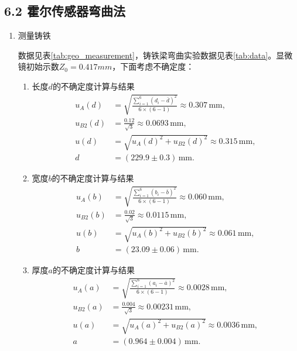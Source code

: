 \documentclass[11pt]{article}
\begin{document}
\subsection*{6.2 霍尔传感器弯曲法}
\begin{enumerate}
    \item 测量铸铁
    
    数据见表\ref{tab:geo_measurement}，铸铁梁弯曲实验数据见表\ref{tab:data}。显微镜初始示数$Z_0 = 0.417mm$，下面考虑不确定度：
\begin{enumerate}
    \item 长度\( d \)的不确定度计算与结果
    \begin{align*}
        u_A(d) &= \sqrt{\frac{\sum_{i=1}^{6}(d_i - \bar{d})^2}{6 \times (6-1)}} \approx 0.307 \, \text{mm}, \\
        u_{B2}(d) &= \frac{0.12}{\sqrt{3}} \approx 0.0693 \, \text{mm}, \\
        u(d) &= \sqrt{u_A(d)^2 + u_{B2}(d)^2} \approx 0.315 \, \text{mm}, \\
        d &= (229.9 \pm 0.3) \, \text{mm}.
    \end{align*}

    \item 宽度\( b \)的不确定度计算与结果
    \begin{align*}
        u_A(b) &= \sqrt{\frac{\sum_{i=1}^{6}(b_i - \bar{b})^2}{6 \times (6-1)}} \approx 0.060 \, \text{mm}, \\
        u_{B2}(b) &= \frac{0.02}{\sqrt{3}} \approx 0.0115 \, \text{mm}, \\
        u(b) &= \sqrt{u_A(b)^2 + u_{B2}(b)^2} \approx 0.061 \, \text{mm}, \\
        b &= (23.09 \pm 0.06) \, \text{mm}.
    \end{align*}

    \item 厚度\( a \)的不确定度计算与结果
    \begin{align*}
        u_A(a) &= \sqrt{\frac{\sum_{i=1}^{6}(a_i - \bar{a})^2}{6 \times (6-1)}} \approx 0.0028 \, \text{mm}, \\
        u_{B2}(a) &= \frac{0.004}{\sqrt{3}} \approx 0.00231 \, \text{mm}, \\
        u(a) &= \sqrt{u_A(a)^2 + u_{B2}(a)^2} \approx 0.0036 \, \text{mm}, \\
        a &= (0.964 \pm 0.004) \, \text{mm}.
    \end{align*}
\end{enumerate}


\end{enumerate}
\end{document}
